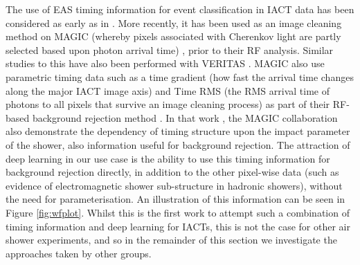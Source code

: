 The use of EAS timing information for event classification in IACT data has been considered as early as in \cite{paulathesis}. More recently, it has been used as an image cleaning method on MAGIC (whereby pixels associated with Cherenkov light are partly selected based upon photon arrival time) \cite{magictime}, prior to their RF analysis. Similar studies to this have also been performed with VERITAS \cite{jamietime}. MAGIC also use parametric timing data such as a time gradient (how fast the arrival time changes along the major IACT image axis) and Time RMS (the RMS arrival time of photons to all pixels that survive an image cleaning process) as part of their RF-based background rejection method \cite{supermagictime}. In that work \cite{supermagictime}, the MAGIC collaboration also demonstrate the dependency of timing structure upon the impact parameter of the shower, also information useful for background rejection. The attraction of deep learning in our use case is the ability to use this timing information for background rejection directly, in addition to the other pixel-wise data (such as evidence of electromagnetic shower sub-structure in hadronic showers), without the need for parameterisation. An illustration of this information can be seen in Figure \ref{fig:wfplot}. Whilst this is the first work to attempt such a combination of timing information and deep learning for IACTs, this is not the case for other air shower experiments, and so in the remainder of this section we investigate the approaches taken by other groups.

